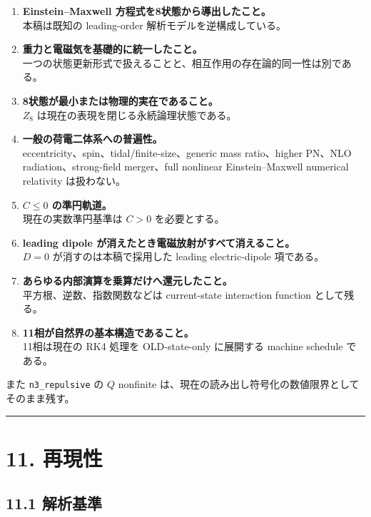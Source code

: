 \documentclass[
  a4paper,
]{ltjsarticle}
\begin{document}
\begin{enumerate}
\def\labelenumi{\arabic{enumi}.}
\item
  \textbf{Einstein--Maxwell 方程式を8状態から導出したこと。}\\
  本稿は既知の leading-order 解析モデルを逆構成している。
\item
  \textbf{重力と電磁気を基礎的に統一したこと。}\\
  一つの状態更新形式で扱えることと、相互作用の存在論的同一性は別である。
\item
  \textbf{8状態が最小または物理的実在であること。}\\
  \(Z_8\) は現在の表現を閉じる永続論理状態である。
\item
  \textbf{一般の荷電二体系への普遍性。}\\
  eccentricity、spin、tidal/finite-size、generic mass ratio、higher
  PN、NLO radiation、strong-field merger、full nonlinear
  Einstein--Maxwell numerical relativity は扱わない。
\item
  \textbf{\(C\le0\) の準円軌道。}\\
  現在の実数準円基準は \(C>0\) を必要とする。
\item
  \textbf{leading dipole が消えたとき電磁放射がすべて消えること。}\\
  \(D=0\) が消すのは本稿で採用した leading electric-dipole 項である。
\item
  \textbf{あらゆる内部演算を乗算だけへ還元したこと。}\\
  平方根、逆数、指数関数などは current-state interaction function
  として残る。
\item
  \textbf{11相が自然界の基本構造であること。}\\
  11相は現在の RK4 処理を OLD-state-only に展開する machine schedule
  である。
\end{enumerate}

また \texttt{n3\_repulsive} の \(Q\) nonfinite
は、現在の読み出し符号化の数値限界としてそのまま残す。

\begin{center}\rule{0.5\linewidth}{0.5pt}\end{center}

\section{11. 再現性}\label{ux518dux73feux6027}

\subsection{11.1 解析基準}\label{ux89e3ux6790ux57faux6e96}
\end{document}
